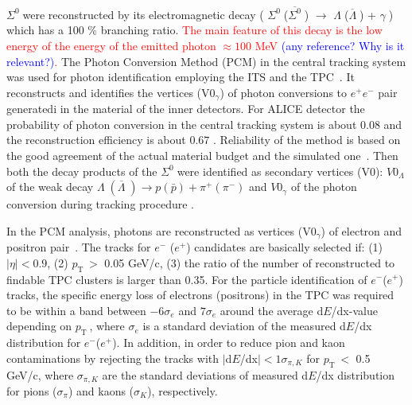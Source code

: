 \documentclass[ALICE,manyauthors]{cernphprep}
\newcommand{\sig}{\ensuremath{\Sigma^0  \; }}
\newcommand{\asig}{\ensuremath{\overline{\Sigma^0} \; }}
\newcommand{\gam}{\ensuremath{\gamma \; }}
\newcommand{\lam}{\ensuremath{\Lambda \; }}
\newcommand{\alam}{\ensuremath{\overline{\Lambda} \; }}
\newcommand{\pt}{\ensuremath{p_{\mathrm{T}\; }}}
\newcommand{\red}{\textcolor{red}}
\newcommand{\blue}{\textcolor{blue}}
\providecommand{\DIFaddtex}[1]{{\protect\color{blue}\uwave{#1}}} %
\providecommand{\DIFaddbegin}{} %
\providecommand{\DIFaddend}{} %
\providecommand{\DIFadd}[1]{\texorpdfstring{\DIFaddtex{#1}}{#1}} %
\begin{document}
\sig  were reconstructed by its electromagnetic decay 
( \sig (\asig) $\to $ \lam (\alam) + \gam \;) which has a 100 \% branching ratio.  
\red{The main feature of this decay is the low energy of the energy of the emitted photon
$\approx 100$ MeV \blue{(any reference? Why is it relevant?)}.}
The Photon Conversion Method (PCM) in the central tracking system was used for photon identification 
employing the ITS and the TPC~\cite{cite:ALICEPerformance,cite:ALICE-DirPhot2016,cite:pi0-2012}.
It  reconstructs and identifies  the vertices (V0$_{\gamma}$) of photon conversions to $e^+ e^-$ pair generatedi in the
material of the inner detectors. For ALICE detector the  probability of photon conversion in the central tracking system is about 0.08 and the 
reconstruction efficiency  is about $0.67$ \cite{cite:pi0-2012}. Reliability of the method is based on the 
good agreement of the actual material budget and the simulated one~\cite{cite:ALICEPerformance}. 
Then both the decay products of the \sig were identified as secondary vertices (V0): $V0_{\Lambda}$ of 
the weak decay   $ \lam (\alam) \to p (\bar p) + \pi^+ (\pi^-)$ and $V0_{\gamma}$ of the photon conversion
\DIFaddbegin \DIFadd{identified }\DIFaddend during tracking procedure \DIFaddbegin \DIFadd{as secondary vertices}\DIFaddend .

In the PCM analysis,  photons are reconstructed as vertices (V0$_{\gamma}$) of  electron and positron 
pair~\cite{cite:pi0-2012,cite:ALICE2014-pi0-pp-pPb-2.76TeV,cite:ALICE-DirPhot2016,cite:ALICE-pi0eta-2018}.
The tracks for $e^-$ ($e^+$) candidates are basically selected if: (1) $|\eta| <0.9$, (2) \pt $>$ 0.05 GeV/c, 
(3) the ratio of the number of reconstructed to findable TPC  clusters is larger than 0.35.
For the particle identification of $e^-$($e^+$) tracks, the specific energy loss of electrons (positrons) in the TPC
was required to be within a band between $-6\sigma_{e}$ and $7\sigma_{e}$ around the
average d$E$/dx-value depending on \pt, where $\sigma_{e}$ is a standard deviation
of the measured d$E$/dx distribution for $e^-$($e^+$).
In addition,  in order to reduce pion and kaon contaminations by rejecting the tracks with $|$d$E$/dx$|<1\sigma_{\pi, K}$ 
for \pt $<$ 0.5 GeV/c, where $\sigma_{\pi, K}$ are the standard deviations of measured d$E$/dx 
distribution for pions ($\sigma_{\pi}$) and kaons ($\sigma_{K}$), respectively. 
\end{document}
